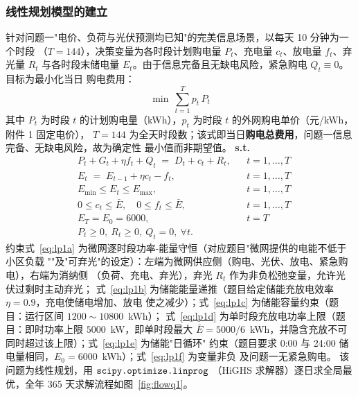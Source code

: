 \documentclass[withoutpreface]{cumcmthesis}
\begin{document}
\subsubsection{线性规划模型的建立}
针对问题一"电价、负荷与光伏预测均已知"的完美信息场景，以每天 10 分钟为一个时段
（$T=144$），决策变量为各时段计划购电量 $P_t$、充电量 $c_t$、放电量 $f_t$、弃光量 $R_t$
与各时段末储电量 $E_t$。由于信息完备且无缺电风险，紧急购电 $Q_t\equiv0$。目标为最小化当日
购电费用：
\begin{equation}
    \min \ \sum_{t=1}^{T} p_t\, P_t
    \label{eq:obj1}
\end{equation}
其中 $P_t$ 为时段 $t$ 的计划购电量（kWh），$p_t$ 为时段 $t$ 的外网购电单价（元/kWh，附件 1 固定电价），
$T=144$ 为全天时段数；该式即当日\textbf{购电总费用}，问题一信息完备、无缺电风险，故为确定性
最小值而非期望值。
\textbf{s.t.}
\begin{subequations}\label{eq:lp1}
\begin{alignat}{2}
    & P_t + G_t + \eta f_t + Q_t \;=\; D_t + c_t + R_t, && t=1,\ldots,T \label{eq:lp1a}\\
    & E_t \;=\; E_{t-1} + \eta c_t - f_t, && t=1,\ldots,T \label{eq:lp1b}\\
    & E_{\min} \le E_t \le E_{\max}, && t=1,\ldots,T \label{eq:lp1c}\\
    & 0\le c_t\le \bar{E},\quad 0\le f_t\le \bar{E}, && t=1,\ldots,T \label{eq:lp1d}\\
    & E_T = E_0 = 6000, && t=T \label{eq:lp1e}\\
    & P_t\ge0,\ R_t\ge0,\ Q_t=0,\ \forall t. \label{eq:lp1f}
\end{alignat}
\end{subequations}
约束式~\eqref{eq:lp1a} 为微网逐时段功率-能量守恒（对应题目"微网提供的电能不低于小区负载
""及"可弃光"的设定）：左端为微网供应侧（购电、光伏、放电、紧急购电），右端为消纳侧
（负荷、充电、弃光），弃光 $R_t$ 作为非负松弛变量，允许光伏过剩时主动弃光；
式~\eqref{eq:lp1b} 为储能能量递推（题目给定储能充放电效率 $\eta=0.9$，充电使储电增加、放电
使之减少）；式~\eqref{eq:lp1c} 为储能容量约束（题目：运行区间 $1200\sim10800$~kWh）；
式~\eqref{eq:lp1d} 为单时段充放电功率上限（题目：即时功率上限 $5000$~kW，即单时段最大
$\bar{E}=5000/6$~kWh，并隐含充放不可同时超过该上限）；式~\eqref{eq:lp1e} 为储能"日循环"
约束（题目要求 0:00 与 24:00 储电量相同，$E_0=6000$~kWh）；式~\eqref{eq:lp1f} 为变量非负
及问题一无紧急购电。\label{con:q1} 该问题为线性规划，用 $\verb|scipy.optimize.linprog|$
（HiGHS 求解器）逐日求全局最优\cite{rp:linprog}，全年 365 天求解流程如图~\ref{fig:flowq1}。
\end{document}
